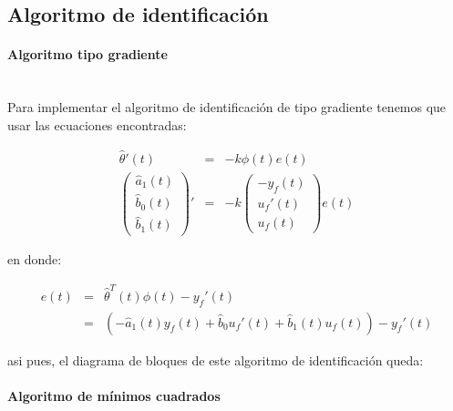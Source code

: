         \subsection{Algoritmo de identificación}

            \paragraph{Algoritmo tipo gradiente}\mbox{}\\

                Para implementar el algoritmo de identificación de tipo gradiente tenemos que usar las ecuaciones encontradas:

                \begin{eqnarray*}
                    \hat{\theta}'(t) & = & -k \phi(t) e(t) \\
                    \begin{pmatrix}
                        \hat{a}_1(t) \\
                        \hat{b}_0(t) \\
                        \hat{b}_1(t)
                    \end{pmatrix}' & = & -k
                    \begin{pmatrix}
                        -y_f(t) \\
                        u_f'(t) \\
                        u_f(t)
                    \end{pmatrix} e(t)
                \end{eqnarray*}

                en donde:

                \begin{eqnarray}
                    e(t) & = & \hat{\theta}^T(t) \phi(t) - y_f'(t) \nonumber \\
                    & = & \left( -\hat{a}_1(t) y_f(t) + \hat{b}_0 u_f'(t) + \hat{b}_1(t) u_f(t) \right) - y_f'(t)
                \end{eqnarray}

                asi pues, el diagrama de bloques de este algoritmo de identificación queda:


            \paragraph{Algoritmo de mínimos cuadrados}\mbox{}\\

